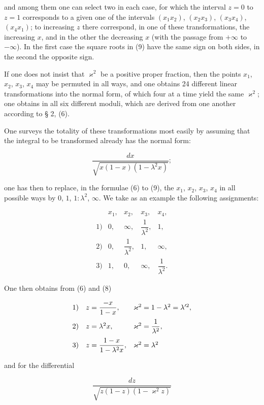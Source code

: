 
and among them one can select two in each case, for which the interval $z = 0$ to $z = 1$ corresponds to a given one of the intervals $(x_1x_2)$, $(x_2x_3)$, $(x_3x_4)$, $(x_4x_1)$; to increasing $z$ there correspond, in one of these transformations, the increasing $x$, and in the other the decreasing $x$ (with the passage from $+\infty$ to $-\infty$). In the first case the square roots in (9) have the same sign on both sides, in the second the opposite sign.

If one does not insist that $\varkappa^2$ be a positive proper fraction, then the points $x_1$, $x_2$, $x_3$, $x_4$ may be permuted in all ways, and one obtains 24 different linear transformations into the normal form, of which four at a time yield the same $\varkappa^2$; one obtains in all six different moduli, which are derived from one another according to § 2, (6).

One surveys the totality of these transformations most easily by assuming that the integral to be transformed already has the normal form:

\[
\dfrac{dx}{\sqrt{x(1-x)(1-\lambda^2x)}};
\]

one has then to replace, in the formulae (6) to (9), the $x_1$, $x_2$, $x_3$, $x_4$ in all possible ways by $0$, $1$, $1:\lambda^2$, $\infty$. We take as an example the following assignments:

\[
\begin{array}{ccccc}
 & x_1, & x_2, & x_3, & x_4, \\\hline
1) & 0, & \infty, & \dfrac{1}{\lambda^2}, & 1, \\[10pt]
2) & 0, & \dfrac{1}{\lambda^2}, & 1, & \infty, \\[10pt]
3) & 1, & 0, & \infty, & \dfrac{1}{\lambda^2}.
\end{array}
\]

One then obtains from (6) and (8)

\[
\begin{array}{c@{\quad}ll}
1) & z = \dfrac{-x}{1-x}, & \varkappa^2 = 1-\lambda^2 = \lambda'^2, \\[10pt]
2) & z = \lambda^2x, & \varkappa^2 = \dfrac{1}{\lambda^2}, \\[10pt]
3) & z = \dfrac{1-x}{1-\lambda^2x}, & \varkappa^2 = \lambda^2
\end{array}
\]

and for the differential

\[
\dfrac{dz}{\sqrt{z(1-z)(1-\varkappa^2z)}}
\]
